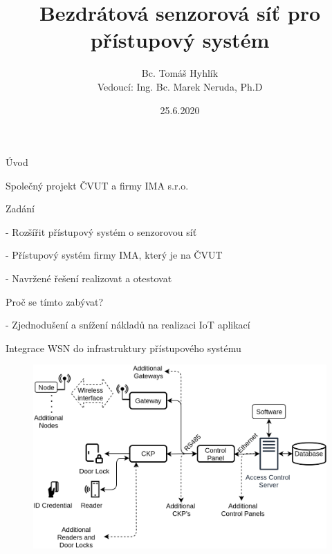 \documentclass{beamer}
\title{Bezdrátová senzorová síť pro přístupový systém}
\date{25.6.2020}
\author{Bc. Tomáš Hyhlík \\
Vedoucí: Ing. Bc. Marek Neruda, Ph.D}
\institute{Katedra Mikroelektroniky}
\newcommand{\SubItem}[1]{
    {\setlength\itemindent{15pt} \item[]#1}
}
\begin{document}
	\maketitle
  

\begin{frame}{Úvod}

	\begin{itemize}
		\item Společný projekt ČVUT a firmy IMA s.r.o. 
		\item Zadání
		\SubItem{- Rozšířit přístupový systém o senzorovou síť}
		\SubItem{- Přístupový systém firmy IMA, který je na ČVUT}
		\SubItem{- Navržené řešení realizovat a otestovat}
		\item Proč se tímto zabývat?
		\SubItem{- Zjednodušení a snížení nákladů na realizaci IoT aplikací}
	\end{itemize}

\end{frame}

	

\begin{frame}{Integrace WSN do infrastruktury přístupového systému}

	\begin{figure}[h]
		\centering
		\includegraphics[width=1\textwidth]{ACS_IoT_extension_21}
		\label{fig:ACS architecture IMA with geteway}
	\end{figure}
		
\end{frame}
\end{document}
